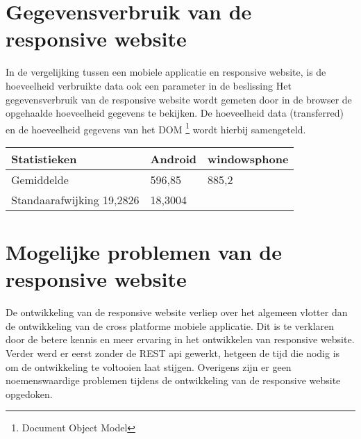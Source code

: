 \section{Gegevensverbruik van de responsive website}
In de vergelijking tussen een mobiele applicatie en responsive website, is de hoeveelheid verbruikte data ook een parameter in de beslissing
Het gegevensverbruik van de responsive website wordt gemeten door in de browser de opgehaalde hoeveelheid gegevens te bekijken.
De hoeveelheid data (transferred) en de hoeveelheid gegevens van het DOM \footnote{Document Object Model} wordt hierbij samengeteld.

\begin{center}
\begin{tabular}{| l | l | l |}
  \hline
  Statistieken & Android & windowsphone\\ \hline
  Gemiddelde & 596,85 & 885,2 \\ \hline
  Standaarafwijking 19,2826 & 18,3004 \\ \hline
\end{tabular}
\end{center}
\section{Mogelijke problemen van de responsive website}
De ontwikkeling van de responsive website verliep over het algemeen vlotter dan de ontwikkeling van de cross platforme mobiele applicatie.
Dit is te verklaren door de betere kennis en meer ervaring in het ontwikkelen van responsive website.
Verder werd er eerst zonder de REST api gewerkt, hetgeen de tijd die nodig is om de ontwikkeling te voltooien laat stijgen.
Overigens zijn er geen noemenswaardige problemen tijdens de ontwikkeling van de responsive website opgedoken.
